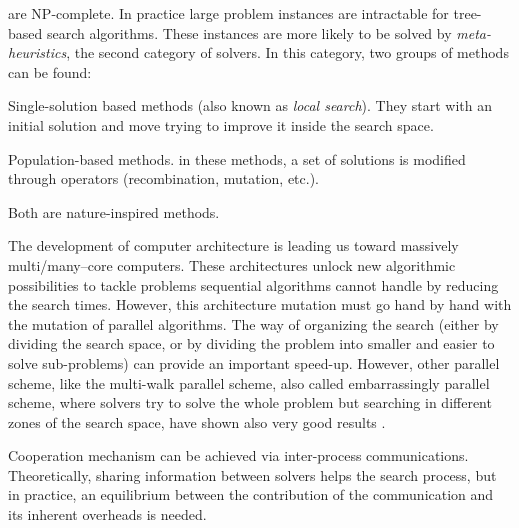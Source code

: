 \CSPs{} are NP-complete. In practice large problem instances are intractable for tree-based search algorithms. These instances are more likely to be solved by \textit{meta-heuristics}, the second category of solvers.
In this category, two groups of methods can be found: %
\begin{inparaenum}[a)] \item Single-solution based methods (also known as \textit{local search}). They start with an initial solution and move trying to improve it inside the search space. \item Population-based methods. in these methods, a set of solutions is modified through operators (recombination, mutation, etc.). \end{inparaenum} Both are nature-inspired methods.

The development of computer architecture is leading us toward massively multi/many--core computers. These architectures unlock new algorithmic possibilities to tackle problems sequential algorithms cannot handle by reducing the search times.  However, this architecture mutation must go hand by hand with the mutation of parallel algorithms. %
The way of organizing the search (either by dividing the search space, or by dividing the problem into smaller and easier to solve sub-problems) can provide an important speed-up. However, other parallel scheme, like the multi-walk parallel scheme, also called embarrassingly parallel scheme, where solvers try to solve the whole problem but searching in different zones of the search space, have shown also very good results \cite{Arbelaez2014a, Caniou2011, Diaz2012a}. %

Cooperation mechanism can be achieved via inter-process communications. Theoretically, sharing information between solvers helps the search process, but in practice, an equilibrium between the contribution of the communication and its inherent overheads is needed.

